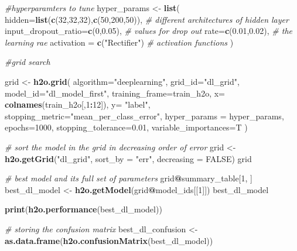 \documentclass[]{article}
\newenvironment{Shaded}{\begin{snugshade}}{\end{snugshade}}
\newcommand{\KeywordTok}[1]{\textcolor[rgb]{0.13,0.29,0.53}{\textbf{#1}}}
\newcommand{\DataTypeTok}[1]{\textcolor[rgb]{0.13,0.29,0.53}{#1}}
\newcommand{\DecValTok}[1]{\textcolor[rgb]{0.00,0.00,0.81}{#1}}
\newcommand{\FloatTok}[1]{\textcolor[rgb]{0.00,0.00,0.81}{#1}}
\newcommand{\StringTok}[1]{\textcolor[rgb]{0.31,0.60,0.02}{#1}}
\newcommand{\CommentTok}[1]{\textcolor[rgb]{0.56,0.35,0.01}{\textit{#1}}}
\newcommand{\OtherTok}[1]{\textcolor[rgb]{0.56,0.35,0.01}{#1}}
\newcommand{\OperatorTok}[1]{\textcolor[rgb]{0.81,0.36,0.00}{\textbf{#1}}}
\newcommand{\NormalTok}[1]{#1}
\begin{document}
\begin{Shaded}
\begin{Highlighting}[]
\CommentTok{#hyperparamters to tune }
\NormalTok{hyper_params <-}\StringTok{ }\KeywordTok{list}\NormalTok{(}
  \DataTypeTok{hidden=}\KeywordTok{list}\NormalTok{(}\KeywordTok{c}\NormalTok{(}\DecValTok{32}\NormalTok{,}\DecValTok{32}\NormalTok{,}\DecValTok{32}\NormalTok{),}\KeywordTok{c}\NormalTok{(}\DecValTok{50}\NormalTok{,}\DecValTok{200}\NormalTok{,}\DecValTok{50}\NormalTok{)),  }\CommentTok{# different architectures of hidden layer}
  \DataTypeTok{input_dropout_ratio=}\KeywordTok{c}\NormalTok{(}\DecValTok{0}\NormalTok{,}\FloatTok{0.05}\NormalTok{),      }\CommentTok{# values for drop out}
  \DataTypeTok{rate=}\KeywordTok{c}\NormalTok{(}\FloatTok{0.01}\NormalTok{,}\FloatTok{0.02}\NormalTok{),                  }\CommentTok{# the learning rae}
  \DataTypeTok{activation =} \KeywordTok{c}\NormalTok{(}\StringTok{"Rectifier"}\NormalTok{)   }\CommentTok{# activation functions}
\NormalTok{)}

\CommentTok{#grid search}

\NormalTok{grid <-}\StringTok{ }\KeywordTok{h2o.grid}\NormalTok{(}
  \DataTypeTok{algorithm=}\StringTok{"deeplearning"}\NormalTok{,}
  \DataTypeTok{grid_id=}\StringTok{"dl_grid"}\NormalTok{,}
  \DataTypeTok{model_id=}\StringTok{"dl_model_first"}\NormalTok{, }
  \DataTypeTok{training_frame=}\NormalTok{train_h2o, }
  \DataTypeTok{x=} \KeywordTok{colnames}\NormalTok{(train_h2o[,}\DecValTok{1}\OperatorTok{:}\DecValTok{12}\NormalTok{]),}
  \DataTypeTok{y=} \StringTok{"label"}\NormalTok{,}
  \DataTypeTok{stopping_metric=}\StringTok{"mean_per_class_error"}\NormalTok{,}
  \DataTypeTok{hyper_params =}\NormalTok{ hyper_params,}
  \DataTypeTok{epochs=}\DecValTok{1000}\NormalTok{,   }
  \DataTypeTok{stopping_tolerance=}\FloatTok{0.01}\NormalTok{,}
  \DataTypeTok{variable_importances=}\NormalTok{T}
\NormalTok{)}
\end{Highlighting}
\end{Shaded}

\begin{Shaded}
\begin{Highlighting}[]
\CommentTok{# sort the model in the grid in decreasing order of error}
\NormalTok{grid <-}\StringTok{ }\KeywordTok{h2o.getGrid}\NormalTok{(}\StringTok{"dl_grid"}\NormalTok{, }\DataTypeTok{sort_by =} \StringTok{"err"}\NormalTok{, }\DataTypeTok{decreasing =} \OtherTok{FALSE}\NormalTok{)}
\NormalTok{grid}

\CommentTok{# best model and its full set of parameters}
\NormalTok{grid}\OperatorTok{@}\NormalTok{summary_table[}\DecValTok{1}\NormalTok{, ]}
\NormalTok{best_dl_model <-}\StringTok{ }\KeywordTok{h2o.getModel}\NormalTok{(grid}\OperatorTok{@}\NormalTok{model_ids[[}\DecValTok{1}\NormalTok{]])}
\NormalTok{best_dl_model}

\KeywordTok{print}\NormalTok{(}\KeywordTok{h2o.performance}\NormalTok{(best_dl_model))}

\CommentTok{# storing the confusion matrix}
\NormalTok{best_dl_confusion <-}\StringTok{ }\KeywordTok{as.data.frame}\NormalTok{(}\KeywordTok{h2o.confusionMatrix}\NormalTok{(best_dl_model))}
\end{Highlighting}
\end{Shaded}
\end{document}
